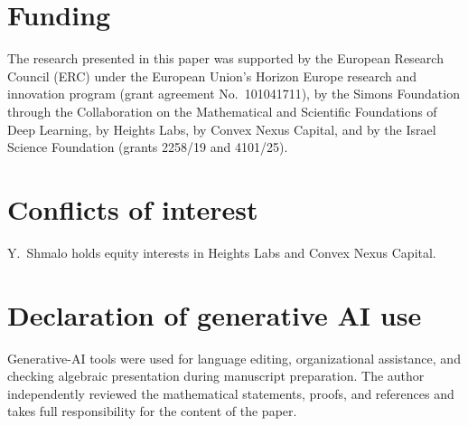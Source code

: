%
%

\section*{Funding}
The research presented in this paper was supported by the European Research
Council (ERC) under the European Union's Horizon Europe research and
innovation program (grant agreement No.~101041711), by the Simons Foundation
through the Collaboration on the Mathematical and Scientific Foundations of
Deep Learning, by Heights Labs, by Convex Nexus Capital, and by the Israel
Science Foundation (grants 2258/19 and 4101/25).

\section*{Conflicts of interest}
Y.~Shmalo holds equity interests in Heights Labs and Convex Nexus Capital.

\section*{Declaration of generative AI use}
Generative-AI tools were used for language editing, organizational
assistance, and checking algebraic presentation during manuscript
preparation.  The author independently reviewed the mathematical statements,
proofs, and references and takes full responsibility for the content of the
paper.

%
